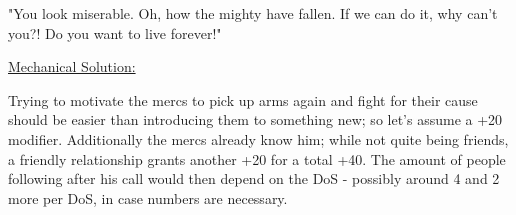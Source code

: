 \begin{multicols}{2}
\begin{exampleblock}
{			"You look miserable. Oh, how the mighty have fallen. If we can do it, why can't you?! Do you want to live forever!"}
	\end{exampleblock}
	\ul{Mechanical Solution:}
	\begin{exampleblock}
		Trying to motivate the mercs to pick up arms again and fight for their cause should be easier than introducing them to something new; so let's assume a +20 modifier. Additionally the mercs already know him; while not quite being friends, a friendly relationship grants another +20 for a total +40. The amount of people following after his call would then depend on the DoS - possibly around 4 and 2 more per DoS, in case numbers are necessary.
	\end{exampleblock}
\end{multicols}